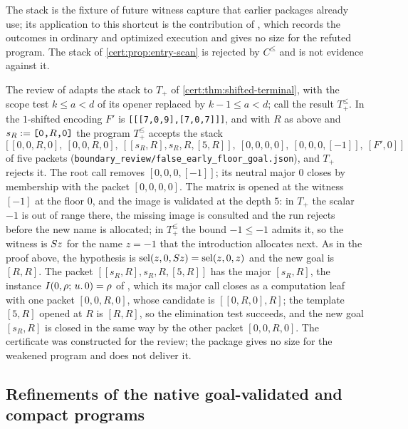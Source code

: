 The stack is the fixture of future witness capture that earlier packages
already use; its application to this shortcut is the contribution of
, which records the outcomes in ordinary and
optimized execution and gives no size for the refuted program. The stack of
\cref{cert:prop:entry-scan} is rejected by $C^{\le}$ and is not evidence
against it.

The review of  adapts the stack to $T_{+}$ of
\cref{cert:thm:shifted-terminal}, with the scope test $k\le a<d$ of its opener
replaced by $k-1\le a<d$; call the result $T^{\le}_{+}$. In the $1$-shifted
encoding $F'$ is \texttt{[[[7,0,9],[7,0,7]]]}, and with $R$ as above and
$s_R\mathrel{:=}\texttt{[0,}R\texttt{,0]}$ the program $T^{\le}_{+}$ accepts the stack
\[
\bigl[\,[0,0,R,0],\ [0,0,R,0],\ [[s_R,R],s_R,R,[5,R]],\ [0,0,0,0],\
[0,0,0,[-1]],\ [F',0]\,\bigr]
\]
of five packets (\texttt{boundary\_review/false\_early\_floor\_goal.json}), and
$T_{+}$ rejects it. The root call removes $[0,0,0,[-1]]$; its neutral major $0$
closes by membership with the packet $[0,0,0,0]$. The matrix is opened at the
witness $[-1]$ at the floor $0$, and the image is validated at the depth $5$: in
$T_{+}$ the scalar $-1$ is out of range there, the missing image is consulted and
the run rejects before the new name is allocated; in $T^{\le}_{+}$ the bound
$-1\le -1$ admits it, so the witness is $S z$ for the name $z=-1$ that the
introduction allocates next. As in the proof above, the hypothesis is
$\operatorname{sel}(z,0,S z)=\operatorname{sel}(z,0,z)$ and the new goal is $[R,R]$. The packet
$[[s_R,R],s_R,R,[5,R]]$ has the major $[s_R,R]$, the instance
$I(0,\rho;\,u.\,0)=\rho$ of , which its major call closes as a
computation leaf with one packet $[0,0,R,0]$, whose candidate is
$[[0,R,0],R]$; the template $[5,R]$ opened at $R$ is $[R,R]$, so the elimination
test succeeds, and the new goal $[s_R,R]$ is closed in the same way by the other
packet $[0,0,R,0]$. The certificate was constructed for the review; the package
gives no size for the weakened program and does not deliver it.

\subsection{Refinements of the native goal-validated and compact programs}\label{cert:sec:native-refinements}

